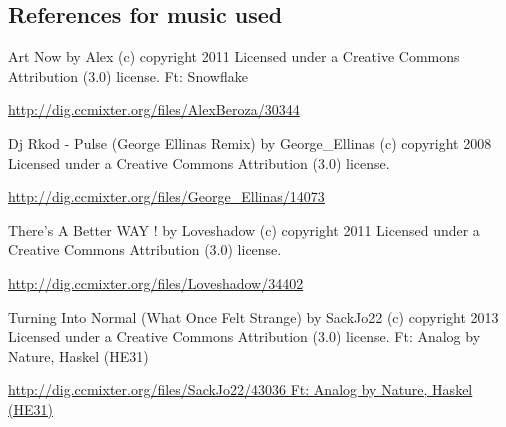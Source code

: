 \documentclass{l4proj}
\begin{document}
\begin{appendices}
\chapter{References for music used}
\begin{description}
    \item Art Now by Alex (c) copyright 2011 Licensed under a Creative Commons Attribution (3.0) license. Ft: Snowflake
    \item \url{http://dig.ccmixter.org/files/AlexBeroza/30344}
\item
    \item Dj Rkod - Pulse (George Ellinas Remix) by George\_Ellinas (c) copyright 2008 Licensed under a Creative Commons Attribution (3.0) license.
    \item \url{http://dig.ccmixter.org/files/George_Ellinas/14073 }
\item
    \item There's A Better WAY ! by Loveshadow (c) copyright 2011 Licensed under a Creative Commons Attribution (3.0) license. 
    \item \url{http://dig.ccmixter.org/files/Loveshadow/34402 }
\item
    \item Turning Into Normal (What Once Felt Strange) by SackJo22 (c) copyright 2013 Licensed under a Creative Commons Attribution (3.0) license. Ft: Analog by Nature, Haskel (HE31)
    \item \url{http://dig.ccmixter.org/files/SackJo22/43036 Ft: Analog by Nature, Haskel (HE31)}
\end{description}

\end{appendices}





\end{document}
